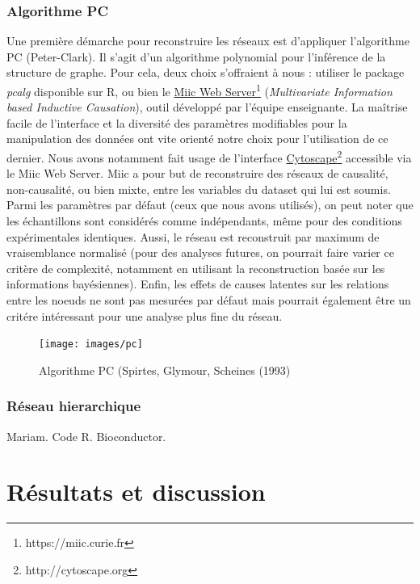 \documentclass[fleqn,11pt]{SelfArx} %
\begin{document}
\subsubsection{Algorithme PC}
Une première démarche pour reconstruire les réseaux est d'appliquer l'algorithme PC\cite{pc} (Peter-Clark). Il s'agit d'un algorithme polynomial pour l'inférence de la structure de graphe. Pour cela, deux choix s'offraient à nous : utiliser le package \textit{pcalg} disponible sur R, ou bien le \href{https://miic.curie.fr}{Miic Web Server}\footnote{https://miic.curie.fr} (\textit{Multivariate Information based Inductive Causation}), outil développé par l'équipe enseignante. La maîtrise facile de l'interface et la diversité des paramètres modifiables pour la manipulation des données ont vite orienté notre choix pour l'utilisation de ce dernier. Nous avons notamment fait usage de l'interface \href{http://cytoscape.org}{Cytoscape}\footnote{http://cytoscape.org} accessible via le Miic Web Server. Miic a pour but de reconstruire des réseaux de causalité, non-causalité, ou bien mixte, entre les variables du dataset qui lui est soumis. Parmi les paramètres par défaut (ceux que nous avons utilisés), on peut noter que les échantillons sont considérés comme indépendants, même pour des conditions expérimentales identiques. Aussi, le réseau est reconstruit par maximum de vraisemblance normalisé (pour des analyses futures, on pourrait faire varier ce critère de complexité, notamment en utilisant la reconstruction basée sur les informations bayésiennes). Enfin, les effets de causes latentes sur les relations entre les noeuds ne sont pas mesurées par défaut mais pourrait également être un critére intéressant pour une analyse plus fine du réseau. 

\begin{figure}[ht]
\centering
\texttt{[image: images/pc]}
\caption{Algorithme PC (Spirtes, Glymour, Scheines (1993)}
\label{fig:pcd}
\end{figure}


\subsubsection{Réseau hierarchique}
Mariam. Code R. Bioconductor. 


\newpage
\section{Résultats et discussion}
\end{document}
